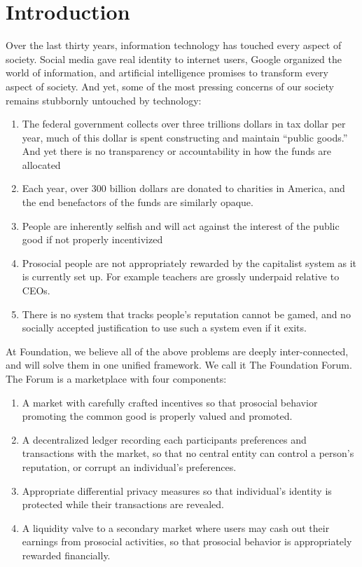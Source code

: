 \section{\textbf{Introduction}}



Over the last thirty years, information technology has touched every aspect of society. Social media gave real identity to internet users, Google organized the world of information, and artificial intelligence promises to transform every aspect of society. And yet, some of the most pressing concerns of our society remains stubbornly untouched by technology:

\begin{enumerate}
	\item The federal government collects over three trillions dollars in tax dollar per year, much of this dollar is spent constructing and maintain “public goods.” And yet there is no transparency or accountability in how the funds are allocated
	\item Each year, over 300 billion dollars are donated to charities in America, and the end benefactors of the funds are similarly opaque. 
	\item People are inherently selfish and will act against the interest of the public good if not properly incentivized
	\item Prosocial people are not appropriately rewarded by the capitalist system as it is currently set up. For example teachers are grossly underpaid relative to CEOs.
	\item There is no system that tracks people’s reputation cannot be gamed, and no socially accepted justification to use such a system even if it exits.
\end{enumerate}


At Foundation, we believe all of the above problems are deeply inter-connected, and will solve them in one unified framework. We call it The Foundation Forum. The Forum is a marketplace with four components:

\begin{enumerate}
	\item A market with carefully crafted incentives so that prosocial behavior promoting the common good is properly valued and promoted.
	\item A decentralized ledger recording each participants preferences and transactions with the market, so that no central entity can control a person’s reputation, or corrupt an individual’s preferences. 
	\item Appropriate differential privacy measures so that individual’s identity is protected while their transactions are revealed.
	\item A liquidity valve to a secondary market where users may cash out their earnings from prosocial activities, so that prosocial behavior is appropriately rewarded financially.  
\end{enumerate}


